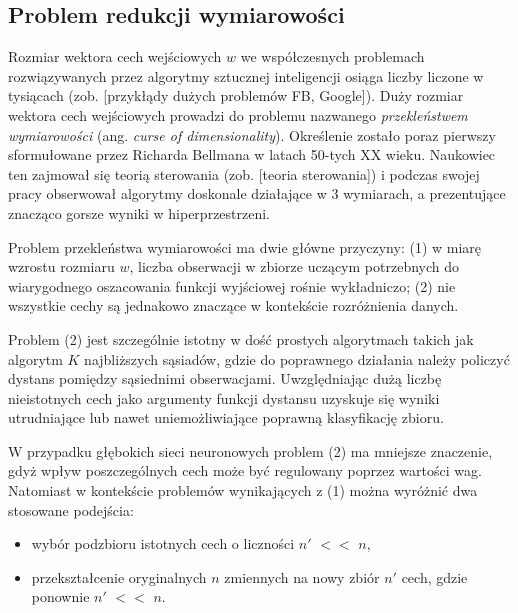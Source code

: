 \subsection{Problem redukcji wymiarowości}

Rozmiar wektora cech wejściowych $w$ we współczesnych problemach rozwiązywanych przez algorytmy sztucznej inteligencji osiąga liczby liczone w tysiącach (zob. [przykłądy dużych problemów FB, Google]). Duży rozmiar wektora cech wejściowych prowadzi do problemu nazwanego \textit{przekleństwem wymiarowości} (ang. \textit{curse of dimensionality}). Określenie zostało poraz pierwszy sformułowane przez Richarda Bellmana w latach 50-tych XX wieku. Naukowiec ten zajmował się teorią sterowania (zob. [teoria sterowania]) i podczas swojej pracy obserwował algorytmy doskonale działające w 3 wymiarach, a prezentujące znacząco gorsze wyniki w hiperprzestrzeni. 

Problem przekleństwa wymiarowości ma dwie główne przyczyny: (1) w miarę wzrostu rozmiaru $w$, liczba obserwacji w zbiorze uczącym potrzebnych do wiarygodnego oszacowania funkcji wyjściowej rośnie wykładniczo; (2) nie wszystkie cechy są jednakowo znaczące w kontekście rozróżnienia danych.  

Problem (2) jest szczególnie istotny w dość prostych algorytmach takich jak algorytm $K$ najbliższych sąsiadów, gdzie do poprawnego działania należy policzyć dystans pomiędzy sąsiednimi obserwacjami. Uwzględniając dużą liczbę nieistotnych cech jako argumenty funkcji dystansu uzyskuje się wyniki utrudniające lub nawet uniemożliwiające poprawną klasyfikację zbioru. 

W przypadku głębokich sieci neuronowych problem (2) ma mniejsze znaczenie, gdyż wpływ poszczególnych cech może być regulowany poprzez wartości wag. Natomiast w kontekście problemów wynikających z (1) można wyróżnić dwa stosowane podejścia:
\begin{itemize}
\item wybór podzbioru istotnych cech o liczności $n'$ $<<$ $n$,
\item przekształcenie oryginalnych $n$ zmiennych na nowy zbiór $n'$ cech, gdzie ponownie $n'$ $<<$ $n$.
\end{itemize}

